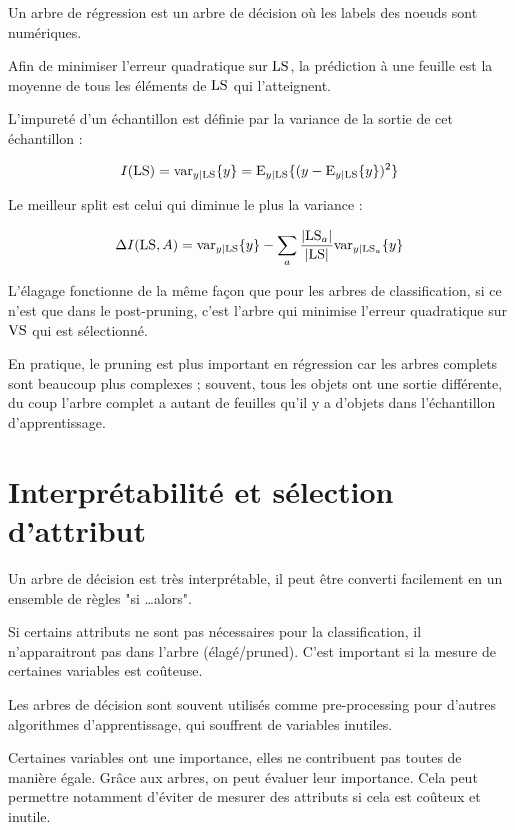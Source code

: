 	Un arbre de régression est un arbre de décision où les labels des noeuds sont numériques.
	

	
	Afin de minimiser l'erreur quadratique sur $\text{LS}$, la prédiction à une feuille est la moyenne de tous les éléments de $\text{LS}$ qui l'atteignent.
	
	L'impureté d'un échantillon est définie par la variance de la sortie de cet échantillon :
	
	$$I(\text{LS}) = \text{var}_{y \vert \text{LS}} \lbrace y \rbrace = \text{E}_{y \vert \text{LS}}\lbrace (y - \text{E}_{y \vert \text{LS}}\lbrace y \rbrace)^2 \rbrace$$
	
	Le meilleur split est celui qui diminue le plus la variance :
	
	$$\Delta I(\text{LS}, A) =\text{var}_{y \vert \text{LS}} \lbrace y \rbrace - \sum_a \frac{\vert \text{LS}_a \vert}{\vert \text{LS} \vert} \text{var}_{y \vert \text{LS}_a} \lbrace y \rbrace$$

	L'élagage fonctionne de la même façon que pour les arbres de classification, si ce n'est que dans le post-pruning, c'est l'arbre qui minimise l'erreur quadratique sur $\text{VS}$ qui est sélectionné.
	
	En pratique, le pruning est plus important en régression car les arbres complets sont beaucoup plus complexes ; souvent, tous les objets ont une sortie différente, du coup l'arbre complet a autant de feuilles qu'il y a d'objets dans l'échantillon d'apprentissage.


\section{Interprétabilité et sélection d'attribut}
	
	Un arbre de décision est très interprétable, il peut être converti facilement en un ensemble de règles "si \dots alors".
	
	Si certains attributs ne sont pas nécessaires pour la classification, il n'apparaitront pas dans l'arbre (élagé/pruned). C'est important si la mesure de certaines variables est coûteuse.
	
	Les arbres de décision sont souvent utilisés comme pre-processing pour d'autres algorithmes d'apprentissage, qui souffrent de variables inutiles.
	
	Certaines variables ont une importance, elles ne contribuent pas toutes de manière égale. Grâce aux arbres, on peut évaluer leur importance. Cela peut permettre notamment d'éviter de mesurer des attributs si cela est coûteux et inutile.
	
